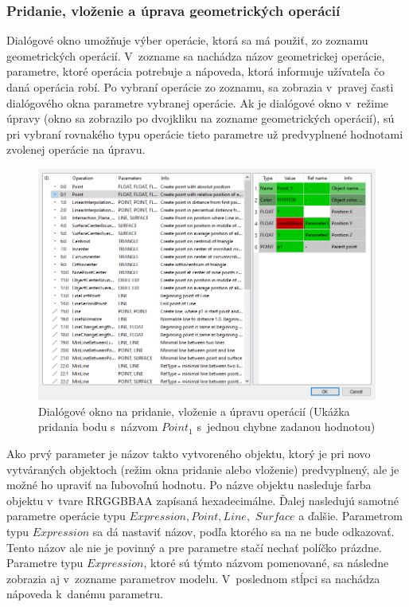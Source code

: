 

\subsubsection{Pridanie, vloženie a úprava geometrických operácií} 
Dialógové okno umožňuje výber operácie,  ktorá sa má použiť, zo zoznamu geometrických operácií. V~zozname sa nachádza názov geometrickej operácie, parametre, ktoré operácia potrebuje a nápoveda, ktorá informuje užívateľa čo daná operácia robí.
Po vybraní operácie zo zoznamu, sa zobrazia v~pravej časti dialógového okna parametre vybranej operácie. Ak je dialógové okno v~režime úpravy (okno sa zobrazilo po dvojkliku na zozname geometrických operácií), sú pri vybraní rovnakého typu operácie tieto parametre už predvyplnené hodnotami zvolenej operácie na úpravu.


\begin{figure}[H]
	\centering
	\includegraphics[width=1\textwidth]{obrazky-figures/Dialog.png}
	\caption{Dialógové okno na pridanie, vloženie a úpravu operácií (Ukážka pridania bodu s~názvom $Point_1$ s~jednou chybne zadanou hodnotou) }
	\label{fig:dialogWindow}
\end{figure}

Ako prvý parameter je názov takto vytvoreného objektu, ktorý je pri novo vytváraných objektoch (režim okna pridanie alebo vloženie) predvyplnený, ale je možné ho upraviť na ľubovoľnú hodnotu.  
Po názve objektu nasleduje farba objektu v~tvare RRGGBBAA zapísaná hexadecimálne.
Ďalej nasledujú samotné parametre operácie typu $Expression,  Point, Line,$ $ Surface$ a ďalšie. Parametrom typu $Expression$ sa dá nastaviť názov, podľa ktorého sa na ne bude odkazovať. Tento názov ale nie je povinný a pre parametre stačí nechať políčko prázdne. Parametre typu $Expression$, ktoré sú týmto názvom pomenované, sa následne zobrazia aj v~zozname parametrov modelu.
V~poslednom stĺpci sa nachádza nápoveda k~danému parametru.

